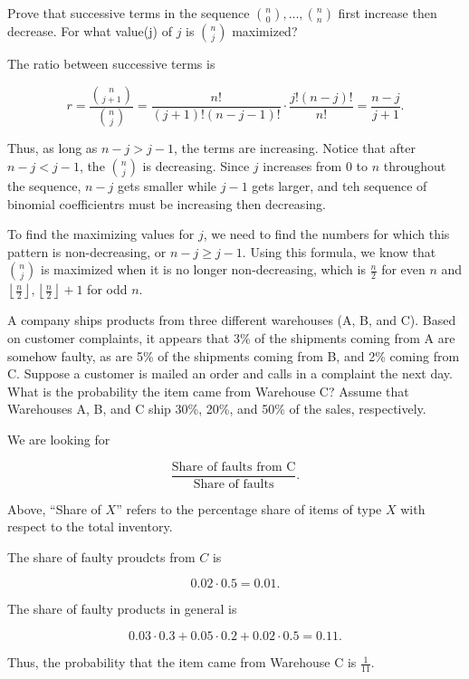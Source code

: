 \documentclass[answers]{exam}
\begin{document}
\begin{questions}
\question[10] Prove that successive terms in the sequence $\binom{n}{0}, \ldots,
\binom{n}{n}$ first increase then decrease. For what value(j) of $j$ is 
$\binom{n}{j}$ maximized?

\begin{solution}
The ratio between successive terms is 

\[
r = \frac{\binom{n}{j+1}}{\binom{n}{j}} = \frac{n!}{(j+1)!(n - j - 1)!} \cdot \frac{j!(n-j)!}{n!} = \frac{n-j}{j+1}
.\] 

Thus, as long as $n-j > j-1$, the terms are increasing. Notice that after $n-j <
j-1$, the $\binom{n}{j}$ is decreasing. Since $j$ increases from $0$ to $n$
throughout the sequence, $n-j$ gets smaller while $j-1$ gets larger, and teh
sequence of binomial coefficientrs must be increasing then decreasing.

To find the maximizing values for $j$, we need to find the numbers for which
this pattern is non-decreasing, or $n-j \ge j-1$. Using this formula, we know
that $\binom{n}{j}$ is maximized when it is no longer non-decreasing, which is
$\frac{n}{2}$ for even $n$ and $\left\lfloor \frac{n}{2} \right\rfloor,
\left\lfloor \frac{n}{2} \right\rfloor+1$ for odd $n$.
\end{solution}

\question[10] A company ships products from three different warehouses (A, B,
and C). Based on customer complaints, it appears that 3\% of the shipments
coming from A are somehow faulty, as are 5\% of the shipments coming from B, and
2\% coming from C. Suppose a customer is mailed an order and calls in a
complaint the next day. What is the probability the item came from Warehouse C?
Assume that Warehouses A, B, and C ship 30\%, 20\%, and 50\% of the sales,
respectively.

\begin{solution}
We are looking for

\[
\frac{\text{Share of faults from C}}{\text{Share of faults}}
.\] 

Above, ``Share of $X$'' refers to the percentage share of items of type $X$ with
respect to the total inventory.

The share of faulty proudcts from $C$ is 

\[
0.02 \cdot 0.5 = 0.01
.\] 

The share of faulty products in general is

\[
0.03 \cdot 0.3 + 0.05 \cdot 0.2 + 0.02 \cdot 0.5 = 0.11
.\] 

Thus, the probability that the item came from Warehouse C is $\frac{1}{11}$.
\end{solution}


\end{questions}
\end{document}
